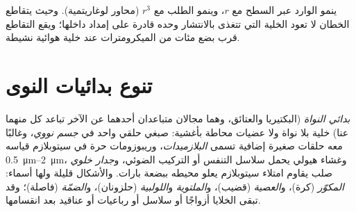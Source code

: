 \begin{omfigure}

{\small ينمو الوارد عبر السطح مع $r$، وينمو الطلب مع
$r^3$ (محاور لوغاريتمية). وحيث يتقاطع الخطان لا تعود الخلية التي
تتغذى بالانتشار وحده قادرة على إمداد داخلها؛ ويقع التقاطع قرب بضع
مئات من الميكرومترات عند خلية هوائية نشيطة.}
\end{omfigure}

\section{تنوع بدائيات النوى}

\begin{definition}\label{def:b2:unicellular-diversity:prokaryote}
\emph{بدائي النواة} (البكتيريا والعتائق، وهما
مجالان متباعدان أحدهما عن الآخر تباعد كل منهما عنا) خلية بلا نواة
ولا عضيات محاطة بأغشية: صبغي حلقي واحد في
\emph{جسم نووي}، وغالبًا معه حلقات صغيرة إضافية
تسمى \emph{البلازميدات}، وريبوزومات حرة في
سيتوبلازم قياسه \qtyrange{0.5}{2}{\micro m}، وغشاء هيولي يحمل
سلاسل التنفس أو التركيب الضوئي، و\emph{جدار خلوي}
صلب يقاوم امتلاء سيتوبلازم يعلو محيطه ببضعة بارات.
والأشكال قليلة ولها أسماء: \emph{المكوّر} (كرة)، و\emph{العصية}
(قضيب)، و\emph{الملتوية} و\emph{اللولبية} (حلزونان)،
و\emph{الضمّة} (فاصلة)؛ وقد تبقى الخلايا أزواجًا أو سلاسل أو
رباعيات أو عناقيد بعد انقسامها.
\end{definition}

